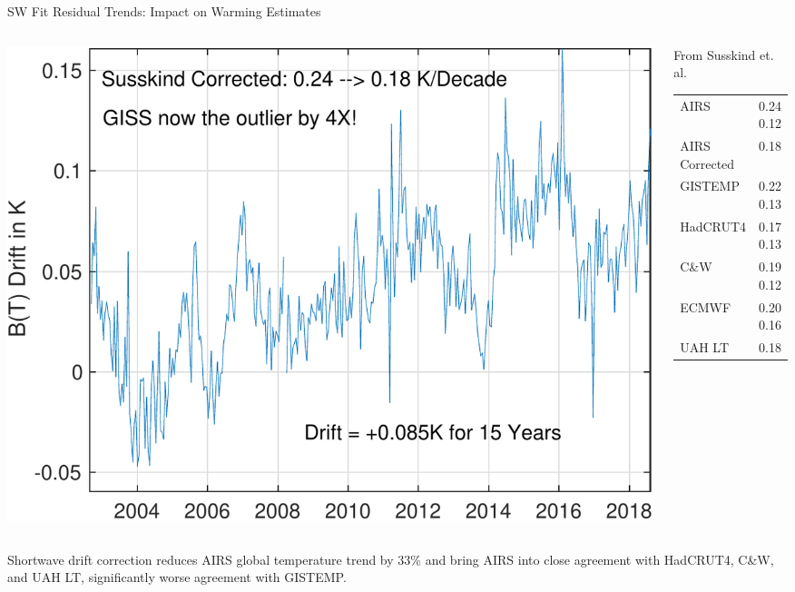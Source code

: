 \documentclass[10pt,t]{beamer}
\begin{document}
\begin{frame}[label={sec:org2ada063}]{SW Fit Residual Trends: Impact on Warming Estimates}
\begin{columns}
\begin{column}{0.6\columnwidth}
\begin{block}{}
\vspace{-0.3in}
\begin{center}
\includegraphics[width=\linewidth]{./Figs/Pdf/bt_drift_from_anom_resid_2613_chan_v2.pdf}
\end{center}
\end{block}
\end{column}

\begin{column}{0.4\columnwidth}
\begin{block}{From Susskind et. al.}
\begin{small}
\begin{center}
\begin{tabular}{ll}
AIRS & 0.24 \textpm{} 0.12\\
AIRS Corrected & 0.18\\
GISTEMP & 0.22 \textpm{} 0.13\\
HadCRUT4 & 0.17 \textpm{} 0.13\\
C\&W & 0.19 \textpm{} 0.12\\
ECMWF & 0.20 \textpm{} 0.16\\
UAH LT & 0.18\\
\end{tabular}
\end{center}
\end{small}
\end{block}
\end{column}
\end{columns}

Shortwave drift correction reduces AIRS global temperature trend by 33\% and bring AIRS into close agreement with HadCRUT4, C\&W, and UAH LT, significantly worse agreement with GISTEMP.

\vspace{-0.1in}
\end{frame}
\end{document}
